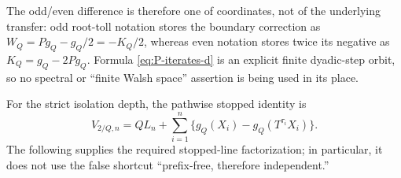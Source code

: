 \documentclass[11pt]{article}
\numberwithin{equation}{section}
\newcommand{\1}{\mathbf 1}\newcommand{\F}{\mathcal F}\newcommand{\D}{\mathcal D}
\begin{document}
The odd/even difference is therefore one of coordinates, not of the
underlying transfer: odd root-toll notation stores the boundary correction
as $W_Q=Pg_Q-g_Q/2=-K_Q/2$, whereas even notation stores twice its negative
as $K_Q=g_Q-2Pg_Q$.  Formula \eqref{eq:P-iterates-d} is an explicit finite
dyadic-step orbit, so no spectral or ``finite Walsh space'' assertion is
being used in its place.

For the strict isolation depth, the pathwise stopped identity is
\begin{equation}V_{2/Q,n}=QL_n+\sum_{i=1}^n\{g_Q(X_i)-g_Q(T^{\tau_i}X_i)\}. \label{eq:res-stop-id}
\end{equation}
The following supplies the required stopped-line factorization; in particular, it does not use the
false shortcut ``prefix-free, therefore independent.''
\end{document}
